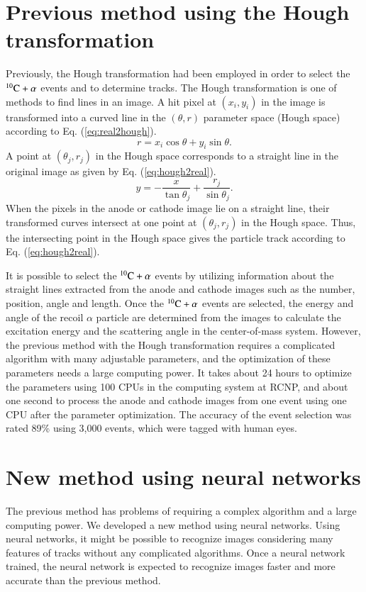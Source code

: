 \documentclass{jps-cp}
\begin{document}
\section{Previous method using the Hough transformation}
Previously, the Hough transformation had been employed in order to
select the ${}^{10}\rm{C}+\alpha$ events and to determine tracks.
The Hough transformation is one of methods to find lines in an image.
A hit pixel at $(x_{i}, y_{i})$ in the image
is transformed into
a curved line in the $(\theta, r)$ parameter space (Hough space)
according to Eq. (\ref{eq:real2hough}).
\begin{equation}
  \label{eq:real2hough}
  r = x_{i}\cos\theta+y_{i}\sin\theta. 
\end{equation}
A point at $(\theta_{j}, r_{j})$ in the Hough space corresponds to a straight line
in the original image as given by Eq. (\ref{eq:hough2real}).
\begin{equation}
  \label{eq:hough2real}
  y = -\frac{x}{\tan\theta_{j}}+\frac{r_{j}}{\sin\theta_{j}}. 
\end{equation}
When the pixels in the anode or cathode image lie on a straight line,
their transformed curves intersect at one point at $(\theta_{j}, r_{j})$ in the Hough space.
Thus, the intersecting point in the Hough space gives the particle track according to Eq. (\ref{eq:hough2real}).

It is possible to select the ${}^{10}\rm{C}+\alpha$ events by
utilizing information about the straight lines extracted from the anode and cathode images such as
the number, position, angle and length.
Once the ${}^{10}\rm{C}+\alpha$ events are selected, the energy and angle of the recoil $\alpha$ particle
are determined from the images to calculate the excitation energy and the scattering angle in the center-of-mass system.
However, the previous method with the Hough transformation requires a complicated algorithm with many adjustable parameters,
and the optimization of these parameters needs a large computing power.
It takes about 24 hours to optimize the parameters using 100 CPUs
in the computing system at RCNP, 
and about one second to process the anode and cathode images from one event using one CPU after the parameter optimization.
The accuracy of the event selection was rated 89\% using 3,000 events,
which were tagged with human eyes.

\section{New method using neural networks}
The previous method has problems of requiring a complex algorithm and a large computing power.
We developed a new method using neural networks.
Using neural networks, it might be possible to recognize images
considering many features of tracks without any complicated algorithms.
Once a neural network trained, the neural network is expected to recognize images faster and more accurate than the previous method.
\end{document}
